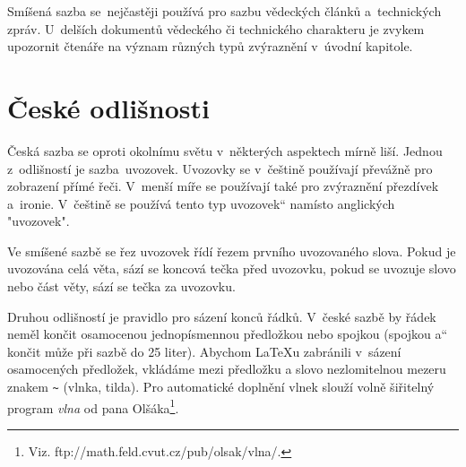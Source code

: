 \documentclass[11pt, a4paper, twocolumn] {article}
\newcommand{\myuv}[1]{\quotedblbase #1\textquotedblleft} %
\begin{document}
Smíšená sazba se~nejčastěji používá pro sazbu vědeckých článků a~technických zpráv. U~delších dokumentů vědeckého či technického charakteru je zvykem upozornit čtenáře na význam různých typů zvýraznění v~úvodní kapitole.

\section{České odlišnosti}
Česká sazba se oproti okolnímu světu v~některých aspektech mírně liší. Jednou z~odlišností je sazba~uvozovek. Uvozovky se v~češtině používají převážně pro zobrazení přímé řeči. V~menší míře se používají také pro zvýraznění přezdívek a~ironie. V~češtině se používá tento \myuv{typ uvozovek} namísto anglických "uvozovek". 

Ve smíšené sazbě se řez uvozovek řídí řezem prvního uvozovaného slova. Pokud je uvozována celá věta, sází se koncová tečka před uvozovku, pokud se uvozuje slovo nebo část věty, sází se tečka za uvozovku. 

Druhou odlišností je pravidlo pro sázení konců řádků. V~české sazbě by řádek neměl končit osamocenou jednopísmennou předložkou nebo spojkou (spojkou \myuv{a} končit může při sazbě do 25 liter). Abychom \LaTeX u zabránili v~sázení osamocených předložek, vkládáme mezi předložku a slovo nezlomitelnou mezeru
znakem \verb|~| (vlnka, tilda). Pro automatické doplnění vlnek slouží volně šiřitelný program \emph{vlna} od pana Olšáka\footnote{Viz. ftp://math.feld.cvut.cz/pub/olsak/vlna/.}. 
\end{document}
